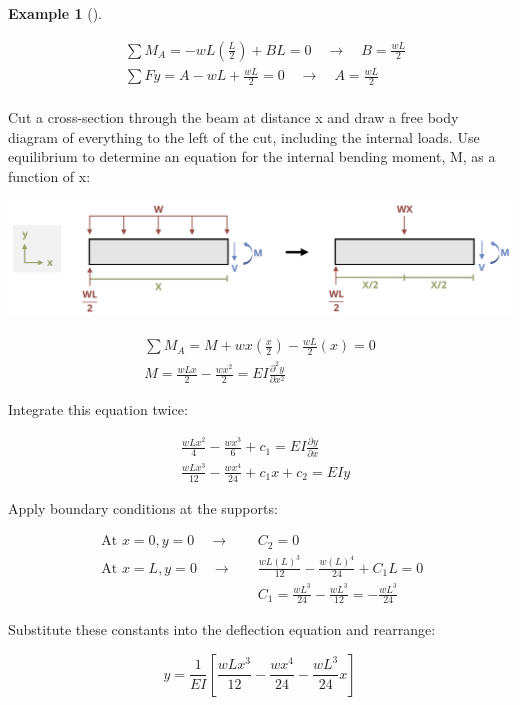 \documentclass[
  letterpaper,
  DIV=11,
  numbers=noendperiod]{scrreprt}
\theoremstyle{definition}
\newtheorem{example}{Example}[chapter]
\theoremstyle{remark}
\begin{document}
\begin{tcolorbox}
\begin{example}[]
\begin{tcolorbox}
\[
\begin{aligned}
& \sum M_A=-wL\left(\frac{L}{2}\right)+B L=0 \quad \rightarrow \quad B=\frac{wL}{2} \\
& \sum F y= A-wL+\frac{wL}{2}=0 \quad\rightarrow\quad A=\frac{wL}{2} \\
& \end{aligned}
\]

Cut a cross-section through the beam at distance x and draw a free body
diagram of everything to the left of the cut, including the internal
loads. Use equilibrium to determine an equation for the internal bending
moment, M, as a function of x:

\begin{center}
\includegraphics{images/CH11 PNGs/example11.1-3.png}
\end{center}

\[
\begin{gathered} \sum M_A= M+w x\left(\frac{x}{2}\right)-\frac{w L}{2}(x)=0 \\ M =\frac{w L x}{2}-\frac{w x^2}{2}=E I \frac{\partial^2 y}{\partial x^2}\end{gathered}
\]

Integrate this equation twice:

\[
\begin{aligned} & \frac{w L x^2}{4}-\frac{w x^3}{6}+c_1=E I \frac{\partial y}{\partial x} \\ & \frac{w L x^3}{12}-\frac{w x^4}{24}+c_1 x+c_2=E I y\end{aligned}
\]

Apply boundary conditions at the supports:

\[
\begin{aligned}
\text { At } x=0, y=0 \quad\rightarrow\quad &C_2=0 \\
\text { At } x=L, y=0 \quad\rightarrow\quad &\frac{w L(L)^3}{12}-\frac{w(L)^4}{24}+C_1 L=0 \\
& C_1=\frac{w L^3}{24}-\frac{wL^3}{12}=-\frac{w L^3}{24}\end{aligned}
\]

Substitute these constants into the deflection equation and rearrange:

\[
y=\frac{1}{E I}\left[\frac{w L x^3}{12}-\frac{w x^4}{24}-\frac{wL^3}{24} x\right]
\]


\end{tcolorbox}
\end{example}
\end{tcolorbox}
\end{document}
